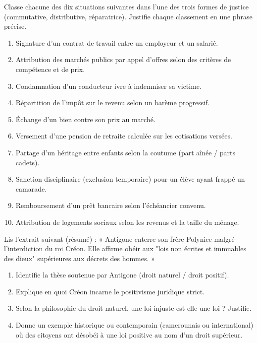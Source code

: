 \documentclass[11pt]{article}
\begin{document}
\begin{exercice}
Classe chacune des dix situations suivantes dans l'une des trois formes de justice (commutative, distributive, réparatrice). Justifie chaque classement en une phrase précise.
\begin{enumerate}
\item Signature d'un contrat de travail entre un employeur et un salarié.
\item Attribution des marchés publics par appel d'offres selon des critères de compétence et de prix.
\item Condamnation d'un conducteur ivre à indemniser sa victime.
\item Répartition de l'impôt sur le revenu selon un barème progressif.
\item Échange d'un bien contre son prix au marché.
\item Versement d'une pension de retraite calculée sur les cotisations versées.
\item Partage d'un héritage entre enfants selon la coutume (part aînée / parts cadets).
\item Sanction disciplinaire (exclusion temporaire) pour un élève ayant frappé un camarade.
\item Remboursement d'un prêt bancaire selon l'échéancier convenu.
\item Attribution de logements sociaux selon les revenus et la taille du ménage.
\end{enumerate}
\end{exercice}

\begin{exercice}
Lis l'extrait suivant (résumé) : « Antigone enterre son frère Polynice malgré l'interdiction du roi Créon. Elle affirme obéir aux "lois non écrites et immuables des dieux" supérieures aux décrets des hommes. »
\begin{enumerate}
\item Identifie la thèse soutenue par Antigone (droit naturel / droit positif).
\item Explique en quoi Créon incarne le positivisme juridique strict.
\item Selon la philosophie du droit naturel, une loi injuste est-elle une loi ? Justifie.
\item Donne un exemple historique ou contemporain (camerounais ou international) où des citoyens ont désobéi à une loi positive au nom d'un droit supérieur.
\end{enumerate}
\end{exercice}
\end{document}
